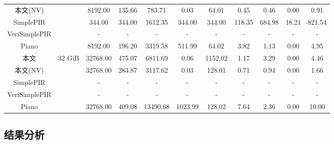 \begin{table}[]
\begin{tabular}{@{}cc|ccc|cccccc@{}}
        本文(NV)     &                           & 8192.00                      & 135.66                     & 783.71   & 0.03                          & \multicolumn{1}{c|}{64.01}   & 0.45   & 0.46   & 0.00        & 0.91   \\
        SimplePIR     &                           & 344.00                       & 344.00                     & 1612.35  & 344.00                        & \multicolumn{1}{c|}{344.00}  & 118.35 & 684.98 & 18.21       & 821.54 \\
        VeriSimplePIR &                           & -                            & -                          & -        & -                             & \multicolumn{1}{c|}{-}       & -      & -      & -           & -      \\
        Piano         &                           & 8192.00                      & 196.20                     & 3319.58  & 511.99                        & \multicolumn{1}{c|}{64.02}   & 3.82   & 1.13   & 0.00        & 4.95   \\ \midrule
        本文         & \multirow{5}{*}{32 GiB}  & 32768.00                     & 475.07                     & 6811.69  & 0.06                          & \multicolumn{1}{c|}{1152.02} & 1.17   & 3.29   & 0.00        & 4.46   \\
        本文(NV)     &                           & 32768.00                     & 283.87                     & 3117.62  & 0.03                          & \multicolumn{1}{c|}{128.01}  & 0.71   & 0.94   & 0.00        & 1.66   \\
        SimplePIR     &                           & -                            & -                          & -        & -                             & \multicolumn{1}{c|}{-}       & -      & -      & -           & -      \\
        VeriSimplePIR &                           & -                            & -                          & -        & -                             & \multicolumn{1}{c|}{-}       & -      & -      & -           & -      \\
        Piano         &                           & 32768.00                     & 409.08                     & 13490.68 & 1023.99                       & \multicolumn{1}{c|}{128.02}  & 7.64   & 2.36   & 0.00        & 10.00  \\ \bottomrule
    \end{tabular}
\end{table}
\subsection{结果分析}

